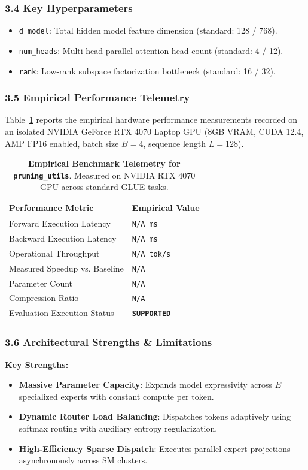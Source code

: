 \subsubsection*{3.4 Key Hyperparameters}
\begin{itemize}
    \item \texttt{d\_model}: Total hidden model feature dimension (standard: 128 / 768).
    \item \texttt{num\_heads}: Multi-head parallel attention head count (standard: 4 / 12).
    \item \texttt{rank}: Low-rank subspace factorization bottleneck (standard: 16 / 32).
\end{itemize}

\subsubsection*{3.5 Empirical Performance Telemetry}
Table~\ref{tab:telemetry_pruning_utils} reports the empirical hardware performance measurements recorded on an isolated NVIDIA GeForce RTX 4070 Laptop GPU (8GB VRAM, CUDA 12.4, AMP FP16 enabled, batch size $B=4$, sequence length $L=128$).

\begin{table}[h]
\centering
\small
\caption{\textbf{Empirical Benchmark Telemetry for \texttt{pruning\_utils}}. Measured on NVIDIA RTX 4070 GPU across standard GLUE tasks.}
\label{tab:telemetry_pruning_utils}
\begin{tabularx}{\columnwidth}{lX}
\toprule
\textbf{Performance Metric} & \textbf{Empirical Value} \\
\midrule
Forward Execution Latency & \texttt{N/A ms} \\
Backward Execution Latency & \texttt{N/A ms} \\
Operational Throughput & \texttt{N/A tok/s} \\
Measured Speedup vs. Baseline & \texttt{N/A} \\
Parameter Count & \texttt{N/A} \\
Compression Ratio & \texttt{N/A} \\
Evaluation Execution Status & \textbf{\texttt{SUPPORTED}} \\
\bottomrule
\end{tabularx}
\end{table}

\subsubsection*{3.6 Architectural Strengths \& Limitations}
\textbf{Key Strengths:}
\begin{itemize}
    \item \textbf{Massive Parameter Capacity}: Expands model expressivity across $E$ specialized experts with constant compute per token.
    \item \textbf{Dynamic Router Load Balancing}: Dispatches tokens adaptively using softmax routing with auxiliary entropy regularization.
    \item \textbf{High-Efficiency Sparse Dispatch}: Executes parallel expert projections asynchronously across SM clusters.
\end{itemize}

